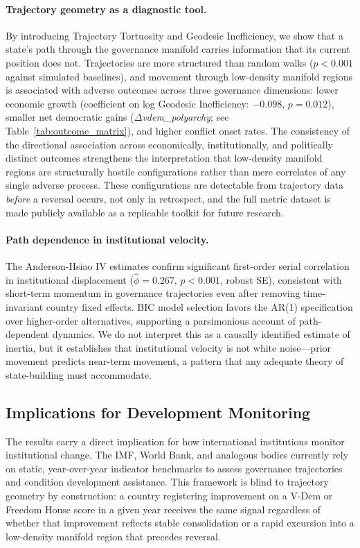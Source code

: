 \documentclass[12pt]{article}
\begin{document}
\paragraph{Trajectory geometry as a diagnostic tool.} By introducing Trajectory Tortuosity and Geodesic Inefficiency, we show that a state's path through the governance manifold carries information that its current position does not. Trajectories are more structured than random walks ($p < 0.001$ against simulated baselines), and movement through low-density manifold regions is associated with adverse outcomes across three governance dimensions: lower economic growth (coefficient on log Geodesic Inefficiency: $-0.098$, $p = 0.012$), smaller net democratic gains ($\Delta$\textit{vdem\_polyarchy}; see Table~\ref{tab:outcome_matrix}), and higher conflict onset rates. The consistency of the directional association across economically, institutionally, and politically distinct outcomes strengthens the interpretation that low-density manifold regions are structurally hostile configurations rather than mere correlates of any single adverse process. These configurations are detectable from trajectory data \textit{before} a reversal occurs, not only in retrospect, and the full metric dataset is made publicly available as a replicable toolkit for future research.

\paragraph{Path dependence in institutional velocity.} The Anderson-Hsiao IV estimates confirm significant first-order serial correlation in institutional displacement ($\hat{\phi} = 0.267$, $p < 0.001$, robust SE), consistent with short-term momentum in governance trajectories even after removing time-invariant country fixed effects. BIC model selection favors the AR(1) specification over higher-order alternatives, supporting a parsimonious account of path-dependent dynamics. We do not interpret this as a causally identified estimate of inertia, but it establishes that institutional velocity is not white noise—prior movement predicts near-term movement, a pattern that any adequate theory of state-building must accommodate.

\subsection{Implications for Development Monitoring}

The results carry a direct implication for how international institutions monitor institutional change. The IMF, World Bank, and analogous bodies currently rely on static, year-over-year indicator benchmarks to assess governance trajectories and condition development assistance. This framework is blind to trajectory geometry by construction: a country registering improvement on a V-Dem or Freedom House score in a given year receives the same signal regardless of whether that improvement reflects stable consolidation or a rapid excursion into a low-density manifold region that precedes reversal.
\end{document}
